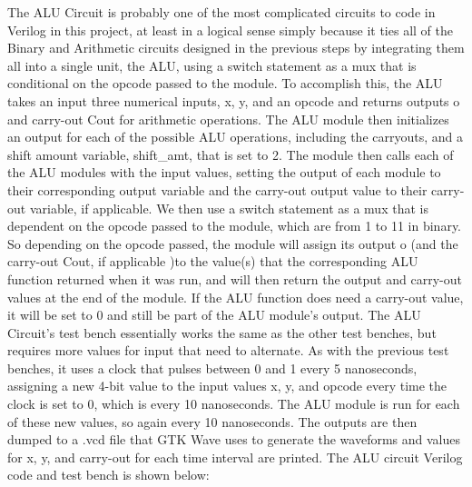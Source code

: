 \documentclass[runningheads, 12pt]{report}
\begin{document}
	The ALU Circuit is probably one of the most complicated circuits to code in Verilog in this project, at least in a logical sense simply because it ties all of the Binary and Arithmetic circuits designed in the previous steps by integrating them all into a single unit, the ALU, using a switch statement as a mux that is conditional on the opcode passed to the module. To accomplish this, the ALU takes an input three numerical inputs, x, y, and an opcode and returns outputs o and carry-out Cout for arithmetic operations. The ALU module then initializes an output for each of the possible ALU operations, including the carryouts, and a shift amount variable, shift\_amt, that is set to 2.  The module then calls each of the ALU modules with the input values, setting the output of each module to their corresponding output variable and the carry-out output value to their carry-out variable, if applicable. We then use a switch statement as a mux that is dependent on the opcode passed to the module, which are from 1 to 11 in binary. So depending on the opcode passed, the module will assign its output o (and the carry-out Cout, if applicable )to the value(s) that the corresponding ALU function returned when it was run, and will then return the output and carry-out values at the end of the module. If the ALU function does need a carry-out value, it will be set to 0 and still be part of the ALU module's output. 
	The ALU Circuit's test bench essentially works the same as the other test benches, but requires more values for input that need to alternate. As with the previous test benches, it uses a clock that pulses between 0 and 1 every 5 nanoseconds, assigning a new 4-bit value to the input values x, y, and opcode every time the clock is set to 0, which is every 10 nanoseconds. The ALU module is run for each of these new values, so again every 10 nanoseconds. The outputs are then dumped to a .vcd file that GTK Wave uses to generate the waveforms and values for x, y, and carry-out for each time interval are printed. The ALU circuit Verilog code and test bench is shown below: 
\end{document}
